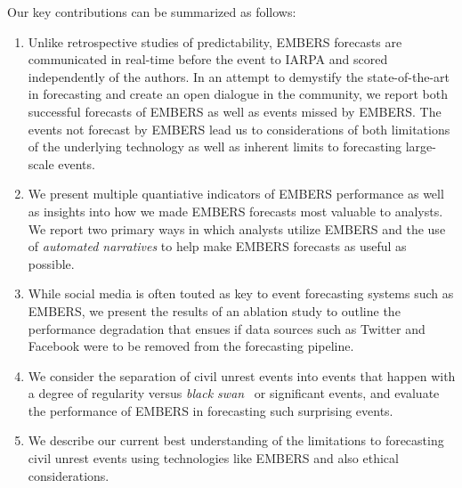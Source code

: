 Our key contributions can be summarized as follows:
\begin{enumerate}
\item Unlike retrospective studies of predictability, EMBERS forecasts are communicated in real-time before the
event to IARPA and scored independently of the authors. In an attempt to demystify the state-of-the-art
in forecasting and create an open dialogue in the community, we report both successful
forecasts of EMBERS as well as events missed by EMBERS. The events not forecast by EMBERS lead us to
considerations of both limitations of the underlying technology as well as inherent limits to
forecasting large-scale events.
\item We present multiple quantiative indicators of EMBERS performance 
as well as insights into how
we made EMBERS forecasts most valuable to analysts. We report two primary
ways in which analysts utilize EMBERS and the use of {\it automated
narratives} to help make EMBERS forecasts as useful as possible.
\item While social media is often touted as key to event forecasting
systems such as EMBERS, we present the results of an ablation study to outline
the performance degradation that ensues if data sources 
such as Twitter and Facebook were to be removed from the forecasting pipeline.
\item We consider the separation of civil unrest events into events
that happen with a degree of regularity versus {\it black swan}~\cite{nassim-taleb} or significant
events, and evaluate the performance of EMBERS in forecasting such
surprising events.
\item We describe our current best understanding of the limitations to
forecasting civil unrest events using technologies like EMBERS and 
also ethical considerations.
\end{enumerate}

